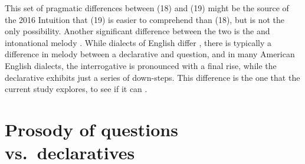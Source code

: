 \documentclass[12pt,oneside]{book}
\begin{document}
This set of pragmatic differences between (18) and (19) might  be the source of the 2016 Intuition that (19) is easier to comprehend than (18), but  is not the only possibility. Another significant difference between the two  is the  and intonational melody . While dialects of English  differ , there is typically a difference in melody between a declarative and  question, and in many American English dialects, the interrogative is pronounced with a final rise, while the declarative exhibits just a series of down-steps. This difference is the one that the current study explores, to see if it can .

\hypertarget{prosody-of-questions-vs.-declaratives}{%
\section{Prosody of questions vs.~declaratives}\label{prosody-of-questions-vs.-declaratives}}
\end{document}
